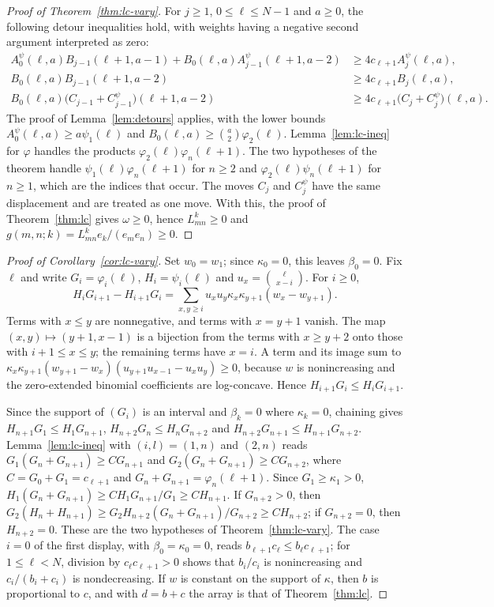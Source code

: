 \documentclass[twoside,10pt]{article}
\numberwithin{equation}{section}
\theoremstyle{slbody}
\theoremstyle{definition}
\theoremstyle{remark}
\begin{document}
\begin{proof}[Proof of Theorem~\ref{thm:lc-vary}]
For $j\geq1$, $0\leq\ell\leq N-1$ and $a\geq0$, the following detour inequalities hold, with weights having a negative second argument interpreted as zero:
\[
\begin{aligned}
A^\psi_0(\ell,a)B_{j-1}(\ell+1,a-1)+B_0(\ell,a)A^\psi_{j-1}(\ell+1,a-2)&\geq4c_{\ell+1}A^\psi_j(\ell,a),\\
B_0(\ell,a)B_{j-1}(\ell+1,a-2)&\geq4c_{\ell+1}B_j(\ell,a),\\
B_0(\ell,a)\bigl(C_{j-1}+C^\psi_{j-1}\bigr)(\ell+1,a-2)&\geq4c_{\ell+1}\bigl(C_j+C^\psi_j\bigr)(\ell,a).
\end{aligned}
\]
The proof of Lemma~\ref{lem:detours} applies, with the lower bounds $A^\psi_0(\ell,a)\geq a\psi_1(\ell)$ and $B_0(\ell,a)\geq\binom a2\varphi_2(\ell)$. Lemma~\ref{lem:lc-ineq} for $\varphi$ handles the products $\varphi_2(\ell)\varphi_n(\ell+1)$. The two hypotheses of the theorem handle $\psi_1(\ell)\varphi_n(\ell+1)$ for $n\geq2$ and $\varphi_2(\ell)\psi_n(\ell+1)$ for $n\geq1$, which are the indices that occur. The moves $C_j$ and $C^\psi_j$ have the same displacement and are treated as one move. With this, the proof of Theorem~\ref{thm:lc} gives $\omega\geq0$, hence $L_{mn}^k\geq0$ and $g(m,n;k)=L_{mn}^ke_k/(e_me_n)\geq0$.
\end{proof}

\begin{proof}[Proof of Corollary~\ref{cor:lc-vary}]
Set $w_0=w_1$; since $\kappa_0=0$, this leaves $\beta_0=0$. Fix $\ell$ and write $G_i=\varphi_i(\ell)$, $H_i=\psi_i(\ell)$ and $u_x=\binom\ell{x-i}$. For $i\geq0$,
\[
H_iG_{i+1}-H_{i+1}G_i=\sum_{x,y\geq i}u_xu_y\kappa_x\kappa_{y+1}(w_x-w_{y+1}).
\]
Terms with $x\leq y$ are nonnegative, and terms with $x=y+1$ vanish. The map $(x,y)\mapsto(y+1,x-1)$ is a bijection from the terms with $x\geq y+2$ onto those with $i+1\leq x\leq y$; the remaining terms have $x=i$. A term and its image sum to $\kappa_x\kappa_{y+1}(w_{y+1}-w_x)(u_{y+1}u_{x-1}-u_xu_y)\geq0$, because $w$ is nonincreasing and the zero-extended binomial coefficients are log-concave. Hence $H_{i+1}G_i\leq H_iG_{i+1}$.

Since the support of $(G_i)$ is an interval and $\beta_k=0$ where $\kappa_k=0$, chaining gives $H_{n+1}G_1\leq H_1G_{n+1}$, $H_{n+2}G_n\leq H_nG_{n+2}$ and $H_{n+2}G_{n+1}\leq H_{n+1}G_{n+2}$. Lemma~\ref{lem:lc-ineq} with $(i,l)=(1,n)$ and $(2,n)$ reads $G_1(G_n+G_{n+1})\geq CG_{n+1}$ and $G_2(G_n+G_{n+1})\geq CG_{n+2}$, where $C=G_0+G_1=c_{\ell+1}$ and $G_n+G_{n+1}=\varphi_n(\ell+1)$. Since $G_1\geq\kappa_1>0$, $H_1(G_n+G_{n+1})\geq C H_1G_{n+1}/G_1\geq CH_{n+1}$. If $G_{n+2}>0$, then $G_2(H_n+H_{n+1})\geq G_2H_{n+2}(G_n+G_{n+1})/G_{n+2}\geq CH_{n+2}$; if $G_{n+2}=0$, then $H_{n+2}=0$. These are the two hypotheses of Theorem~\ref{thm:lc-vary}. The case $i=0$ of the first display, with $\beta_0=\kappa_0=0$, reads $b_{\ell+1}c_\ell\leq b_\ell c_{\ell+1}$; for $1\leq\ell<N$, division by $c_\ell c_{\ell+1}>0$ shows that $b_i/c_i$ is nonincreasing and $c_i/(b_i+c_i)$ is nondecreasing. If $w$ is constant on the support of $\kappa$, then $b$ is proportional to $c$, and with $d=b+c$ the array is that of Theorem~\ref{thm:lc}.
\end{proof}
\end{document}
